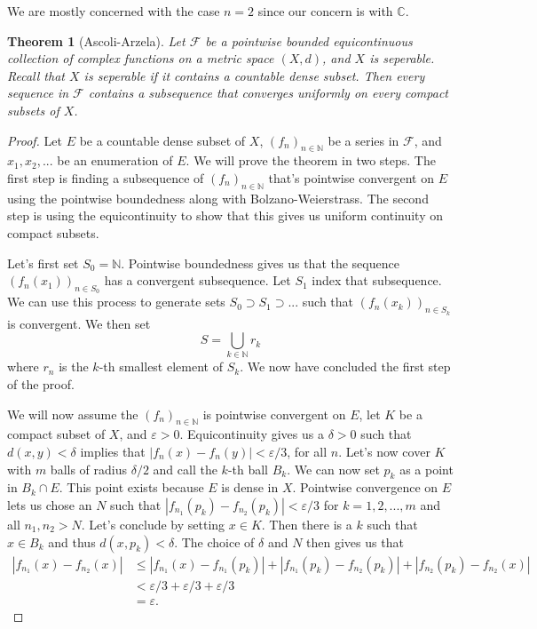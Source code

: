 \documentclass[a4paper,12pt,twoside,BCOR=10mm]{scrbook}
\newtheorem{theorem}{Theorem}[section]
\theoremstyle{definition}
\theoremstyle{definition}
\theoremstyle{definition}
\begin{document}
We are mostly concerned with the case $n = 2$ since our concern is with $\mathbb{C}$.
\begin{theorem}[Ascoli-Arzela]
Let $\mathcal{F}$ be a pointwise bounded equicontinuous collection of complex functions on a metric space $(X, d)$, and $X$ is seperable.
Recall that $X$ is seperable if it contains a countable dense subset.
Then every sequence in $\mathcal{F}$ contains a subsequence that converges uniformly on every compact subsets of $X$.
\end{theorem}
\begin{proof}
Let $E$ be a countable dense subset of $X$,
	$(f_n)_{n \in \mathbb{N}}$ be a series in $\mathcal{F}$,
	and $x_1, x_2, ...$ be an enumeration of $E$.
We will prove the theorem in two steps.
The first step is finding a subsequence of $(f_n)_{n \in \mathbb{N}}$ that's pointwise convergent on $E$ using the pointwise boundedness along with Bolzano-Weierstrass.
The second step is using the equicontinuity to show that this gives us uniform continuity on compact subsets.

Let's first set $S_0 = \mathbb{N}$.
Pointwise boundedness gives us that the sequence $(f_n(x_1))_{n \in S_0}$ has a convergent subsequence.
Let $S_1$ index that subsequence.
We can use this process to generate sets $S_0 \supset S_1 \supset ...$ such that $(f_n(x_k))_{n \in S_k}$ is convergent.
We then set
\[
	S = \bigcup_{k \in \mathbb{N}} r_k
\]
where $r_n$ is the $k$-th smallest element of $S_k$.
We now have concluded the first step of the proof.

We will now assume the $(f_n)_{n \in \mathbb{N}}$ is pointwise convergent on $E$,
	let $K$ be a compact subset of $X$, and
	$\varepsilon > 0$.
Equicontinuity gives us a $\delta > 0$ such that $d(x, y) < \delta$ implies that $|f_n(x) - f_n(y)| < \varepsilon /3$, for all $n$.
Let's now cover $K$ with $m$ balls of radius $\delta /2$ and call the $k$-th ball $B_k$.
We can now set $p_k$ as a point in $B_k \cap E$.
This point exists because $E$ is dense in $X$.
Pointwise convergence on $E$ lets us chose an $N$ such that $|f_{n_1}(p_k) - f_{n_2}(p_k)| < \varepsilon /3$ for $k = 1, 2, ..., m$ and all $n_1, n_2 > N$.
Let's conclude by setting $x \in K$.
Then there is a $k$ such that $x \in B_k$ and thus $d(x, p_k) < \delta$.
The choice of $\delta$ and $N$ then gives us that
\begin{align*}
	|f_{n_1}(x) - f_{n_2}(x)|
	& \leq |f_{n_1}(x) - f_{n_1}(p_k)| + |f_{n_1}(p_k) - f_{n_2}(p_k)| + |f_{n_2}(p_k) - f_{n_2}(x)|\\
	& < \varepsilon /3 + \varepsilon /3 + \varepsilon /3 \\
	& = \varepsilon.
\end{align*}
\end{proof}
\end{document}
